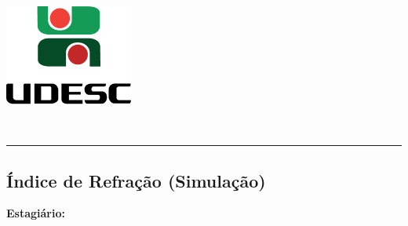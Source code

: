 \begin{center}
    \begin{minipage}[!]{\linewidth}
        \begin{minipage}[!]{.19\linewidth}
            \includegraphics[width=\linewidth]{img/logo.png}           
        \end{minipage}
        \begin{minipage}[!]{.8\linewidth}
            \center
            \ABNTEXchapterfont\normalsize\MakeUppercase{\imprimirinstituicao}
            \par
            \vspace*{10pt}                     
            \ABNTEXchapterfont\normalsize\MakeUppercase{\centro}
            \par
            \vspace*{10pt}           
            \ABNTEXchapterfont\normalsize\MakeUppercase{\disciplina}
        \end{minipage}        
    \end{minipage}
    \\ \vspace{0.5cm}
    \rule{\textwidth}{.5pt}   
\end{center}

\textual
    \begin{center}
        \section{Índice de Refração (Simulação)}
        \par
    \end{center}        
        \noindent \textbf{Estagiário:} \imprimirautor 
        
